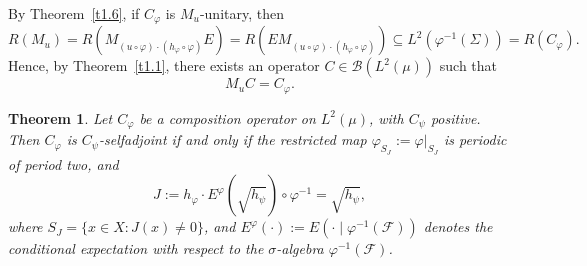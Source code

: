\documentclass{amsart}
\newtheorem{thm}{Theorem}[section]
\theoremstyle{definition}\newtheorem{defn}[thm]{Definition}
\theoremstyle{remark}
\numberwithin{equation}{section}
\begin{document}
By Theorem~\ref{t1.6}, if \( C_{\varphi} \) is \( M_u \)-unitary, then
\[
R(M_u) = R\left(M_{(u \circ \varphi) \cdot (h_{\varphi} \circ \varphi)} E\right) = R\left(E M_{(u \circ \varphi) \cdot (h_{\varphi} \circ \varphi)}\right) \subseteq L^2(\varphi^{-1}(\Sigma)) = R(C_{\varphi}).
\]
Hence, by Theorem~\ref{t1.1}, there exists an operator \( C \in \mathcal{B}(L^2(\mu)) \) such that
\[
M_u C = C_{\varphi}.
\]

\begin{thm}\label{t1.9}
Let \( C_{\varphi} \) be a composition operator on \( L^2(\mu) \), with \( C_{\psi} \) positive. Then \( C_{\varphi} \) is \( C_{\psi} \)-selfadjoint if and only if the restricted map \( \varphi_{S_J} := \varphi|_{S_J} \) is periodic of period two, and
\[
J := h_{\varphi} \cdot E^{\varphi}(\sqrt{h_{\psi}}) \circ \varphi^{-1} = \sqrt{h_{\psi}},
\]
where \( S_J = \{x \in X : J(x) \neq 0\} \), and \( E^{\varphi}(\cdot) := E(\cdot \mid \varphi^{-1}(\mathcal{F})) \) denotes the conditional expectation with respect to the \(\sigma\)-algebra \( \varphi^{-1}(\mathcal{F}) \).
\end{thm}
\end{document}
